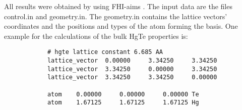 	All results were obtained by using FHI-aims \cite{aims}. 
	The input data are the files control.in and geometry.in.
	The geometry.in contains the lattice vectors' coordinates and the positions and types of the atom forming the basis. One example for the calculations of the bulk HgTe properties is:
		\begin{verbatim}
			# hgte lattice constant 6.685 AA
			lattice_vector	0.00000		3.34250		3.34250
			lattice_vector	3.34250		0.00000		3.34250
			lattice_vector	3.34250		3.34250		0.00000
			
			atom	0.00000		0.00000		0.00000 Te
			atom	1.67125		1.67125		1.67125 Hg
		\end{verbatim}
	
